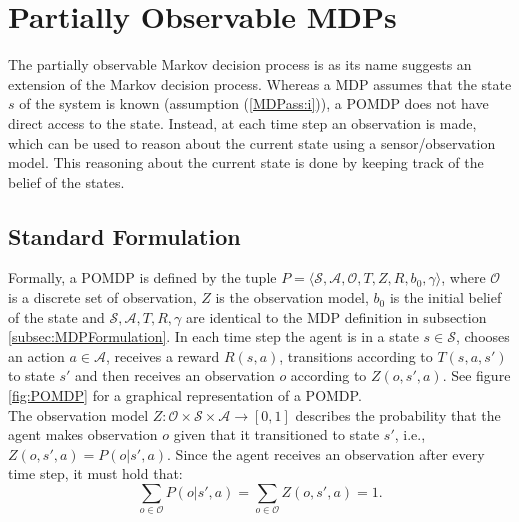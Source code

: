 
\section{Partially Observable MDPs}\label{sec:POMDP}
The partially observable Markov decision process is as its name suggests an extension of the Markov decision process. Whereas a MDP assumes that the state $s$ of the system is known (assumption (\ref{MDPass:i})), a POMDP does not have direct access to the state. Instead, at each time step an observation is made, which can be used to reason about the current state using a sensor/observation model. This reasoning about the current state is done by keeping track of the belief of the states.
\subsection{Standard Formulation}
Formally, a POMDP is defined by the tuple $P = \langle \mathcal{S}, \mathcal{A}, \mathcal{O}, T, Z, R, b_0, \gamma \rangle$, where $\mathcal{O}$ is a discrete set of observation, $Z$ is the observation model, $b_0$ is the initial belief of the state and $\mathcal{S}, \mathcal{A}, T, R, \gamma$ are identical to the MDP definition in subsection \ref{subsec:MDPFormulation}. In each time step the agent is in a state $s\in\mathcal{S}$, chooses an action $a\in\mathcal{A}$, receives a reward $R(s,a)$, transitions according to $T(s,a,s')$ to state $s'$ and then receives an observation $o$ according to $Z(o, s', a)$. See figure \ref{fig:POMDP} for a graphical representation of a POMDP.\\ The observation model $Z:\mathcal{O}\times\mathcal{S}\times\mathcal{A}\rightarrow [0, 1]$ describes the probability that the agent makes observation $o$ given that it transitioned to state $s'$, i.e., $Z(o,s',a) = P(o|s',a)$. Since the agent receives an observation after every time step, it must hold that:
\begin{equation}
    \sum_{o\in\mathcal{O}}P(o|s',a) = \sum_{o\in\mathcal{O}}Z(o,s', a) = 1.
\end{equation}

